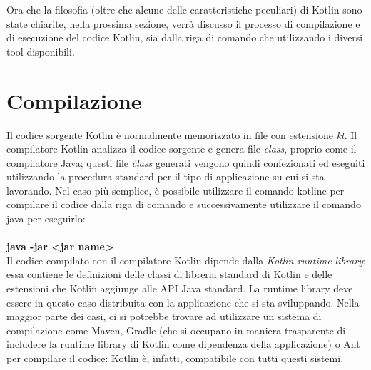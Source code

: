 Ora che la filosofia (oltre che alcune delle caratteristiche peculiari) di Kotlin sono state chiarite, nella prossima sezione, verrà discusso il processo di compilazione e di esecuzione del codice Kotlin, sia dalla riga di comando che utilizzando i diversi tool disponibili.


\section{Compilazione}
Il codice sorgente Kotlin è normalmente memorizzato in file con estensione {\em\.kt}. Il compilatore Kotlin analizza il codice sorgente e genera file {\em\.class}, proprio come il compilatore Java; questi file {\em\.class} generati vengono quindi confezionati ed eseguiti utilizzando la procedura standard per il tipo di applicazione su cui si sta lavorando. Nel caso più semplice, è possibile utilizzare il comando {\ttfamily kotlinc} per compilare il codice dalla riga di comando e successivamente utilizzare il comando {\ttfamily java} per eseguirlo:\\

{\bfseries
{}\\
{\ttfamily java -jar <jar name>}
}\\

Il codice compilato con il compilatore Kotlin dipende dalla {\em Kotlin runtime library}: essa contiene le definizioni delle classi di libreria standard di Kotlin e delle estensioni che Kotlin aggiunge alle API Java standard. La runtime library deve essere in questo caso distribuita con la applicazione che si sta sviluppando. Nella maggior parte dei casi, ci si potrebbe trovare ad utilizzare un sistema di compilazione come Maven, Gradle (che si occupano in maniera trasparente di includere la runtime library di Kotlin come dipendenza della applicazione) o Ant per compilare il codice: Kotlin è, infatti, compatibile con tutti questi sistemi.\\
